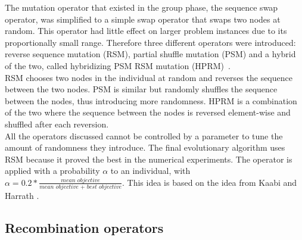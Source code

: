 \documentclass[a4paper,10pt]{article}
\newcommand{\ReplaceMe}[1]{{\color{blue}#1}}
\begin{document}
The mutation operator that existed in the group phase, the sequence swap operator, was simplified to a simple swap operator that swaps two nodes at random. This operator had little effect on larger problem instances due to its proportionally small range. Therefore three different operators were introduced: reverse sequence mutation (RSM), partial shuffle mutation (PSM) and a hybrid of the two, called hybridizing PSM RSM mutation (HPRM)~\cite{hprm}.\\
RSM chooses two nodes in the individual at random and reverses the sequence between the two nodes. PSM is similar but randomly shuffles the sequence between the nodes, thus introducing more randomness. HPRM is a combination of the two where the sequence between the nodes is reversed element-wise and shuffled after each reversion.\\
All the operators discussed cannot be controlled by a parameter to tune the amount of randomness they introduce. The final evolutionary algorithm uses RSM because it proved the best in the numerical experiments. The operator is applied with a probability $\alpha$ to an individual, with $\alpha = 0.2 *\frac{ \textit{mean objective}}{\textit{mean objective } + \textit{ best objective}}$. This idea is based on the idea from Kaabi and Harrath \cite{ann}. 

\subsection{Recombination operators}

\end{document}
